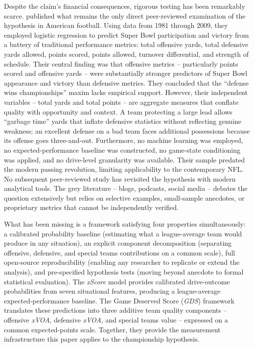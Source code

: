 \documentclass[12pt,a4paper]{article}
\newcommand{\xscore}{\textit{xScore}}
\newcommand{\xvoa}{\textit{xVOA}}
\newcommand{\gds}{\textit{GDS}}
\begin{document}
Despite the claim's financial consequences, rigorous testing has been remarkably scarce. \citet{robst2011defense} published what remains the only direct peer-reviewed examination of the hypothesis in American football. Using data from 1981 through 2009, they employed logistic regression to predict Super Bowl participation and victory from a battery of traditional performance metrics: total offensive yards, total defensive yards allowed, points scored, points allowed, turnover differential, and strength of schedule. Their central finding was that offensive metrics -- particularly points scored and offensive yards -- were substantially stronger predictors of Super Bowl appearance and victory than defensive metrics. They concluded that the ``defense wins championships'' maxim lacks empirical support. However, their independent variables -- total yards and total points -- are aggregate measures that conflate quality with opportunity and context. A team protecting a large lead allows ``garbage time'' yards that inflate defensive statistics without reflecting genuine weakness; an excellent defense on a bad team faces additional possessions because its offense goes three-and-out. Furthermore, no machine learning was employed, no expected-performance baseline was constructed, no game-state conditioning was applied, and no drive-level granularity was available. Their sample predated the modern passing revolution, limiting applicability to the contemporary NFL. No subsequent peer-reviewed study has revisited the hypothesis with modern analytical tools. The grey literature -- blogs, podcasts, social media -- debates the question extensively but relies on selective examples, small-sample anecdotes, or proprietary metrics that cannot be independently verified.

What has been missing is a framework satisfying four properties simultaneously: a calibrated probability baseline (estimating what a league-average team would produce in any situation), an explicit component decomposition (separating offensive, defensive, and special teams contributions on a common scale), full open-source reproducibility (enabling any researcher to replicate or extend the analysis), and pre-specified hypothesis tests (moving beyond anecdote to formal statistical evaluation). The \xscore{} model \citep{mecha2026xscore-model} provides calibrated drive-outcome probabilities from seven situational features, producing a league-average expected-performance baseline. The Game Deserved Score (\gds{}) framework \citep{mecha2026gds} translates these predictions into three additive team quality components -- offensive \xvoa{}, defensive \xvoa{}, and special teams value -- expressed on a common expected-points scale. Together, they provide the measurement infrastructure this paper applies to the championship hypothesis.
\end{document}
